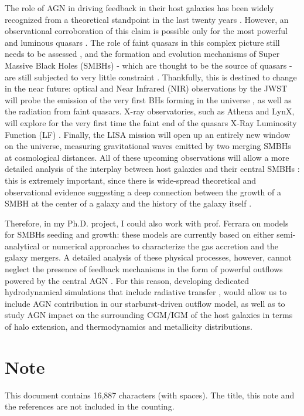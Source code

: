 \documentclass[12pt]{article}
\begin{document}
The role of AGN in driving feedback in their host galaxies has been widely recognized from a theoretical standpoint in the last twenty years \citep{Harrison:2018jvh}. However, an observational corroboration of this claim is possible only for the most powerful and luminous quasars \citep{cicone2015}. The role of faint quasars in this complex picture still needs to be assessed \citep{shin2020infrared}, and the formation and evolution mechanisms of Super Massive Black Holes (SMBHs) - which are thought to be the source of quasars \citep{netzer2015revisiting} - are still subjected to very little constraint \citep{cattaneo2009role}. Thankfully, this is destined to change in the near future: optical and Near Infrared (NIR) observations by the JWST will probe the emission of the very first BHs forming in the universe \citep{Latif:2016qau, Pacucci:2017mcu}, as well as the radiation from faint quasars. X-ray observatories, such as Athena \citep{2017AN....338..153B} and LynX, will explore for the very first time the faint end of the quasars X-Ray Luminosity Function (LF) \citep{degraf2010faint}. Finally, the LISA mission \citep{Barausse:2020rsu} will open up an entirely new window on the universe, measuring gravitational waves emitted by two merging SMBHs at cosmological distances. All of these upcoming observations will allow a more detailed analysis of the interplay between host galaxies and their central SMBHs \citep{volonteri2012black, Bromm:2002hb, Haiman:2012ic}: this is extremely important, since there is wide-spread theoretical and observational evidence suggesting a deep connection between the growth of a SMBH at the center of a galaxy and the history of the galaxy itself \citep{Ferrarese:2000se, 2000ApJ...539L..13G, kormendy}.


Therefore, in my Ph.D. project, I could also work with prof. Ferrara on models for SMBHs seeding and growth: these models are currently based on either semi-analytical \citep{Pacucci:2020orw,piana2021mass} or numerical \citep{habouzit2020supermassive,zhu2020formation, degraf2020morphological} approaches to characterize the gas accretion and the galaxy mergers. A detailed analysis of these physical processes, however, cannot neglect the presence of feedback mechanisms in the form of powerful outflows powered by the central AGN \citep{Fiore_2017, costa2020powering}. For this reason, developing dedicated
hydrodynamical simulations that include radiative transfer \citep{Sijacki:2007rw, Hopkins18, Beckmann:2017luq}, would allow us to include AGN contribution in our starburst-driven outflow model, as well as to study AGN impact on the surrounding CGM/IGM of the host galaxies in terms of halo extension, and thermodynamics and metallicity distributions.









\section*{Note}

This document contains 16,887 characters (with spaces). The title, this note and the references are not included in the counting.



\end{document}

